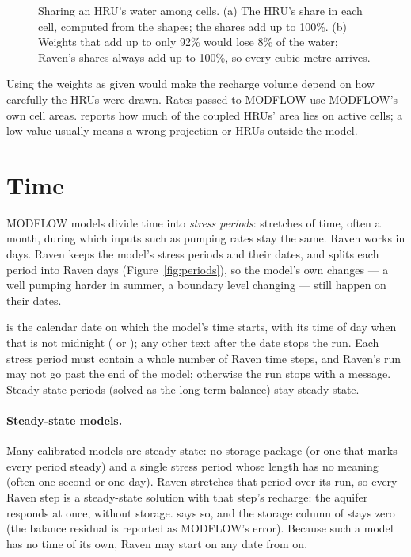 \begin{figure}[!htbp]\centering
\caption{Sharing an HRU's water among cells. (a) The HRU's share in each cell, computed from the shapes; the shares add up to 100\%. (b) Weights that add up to only 92\% would lose 8\% of the water; Raven's shares always add up to 100\%, so every cubic metre arrives.}\label{fig:linking}
\end{figure}

Using the weights as given would make the recharge volume depend on how carefully the HRUs were drawn. Rates passed to MODFLOW use MODFLOW's own cell areas.  reports how much of the coupled
HRUs' area lies on active cells; a low value usually means a wrong projection or HRUs outside the model.

\section{Time}\label{sec:existingtime}
MODFLOW models divide time into \emph{stress periods}: stretches of time, often a month, during which inputs such as pumping
rates stay the same. Raven works in days. Raven keeps the model's stress periods and their dates, and splits each period into
Raven days (Figure~\ref{fig:periods}), so the model's own changes --- a well pumping harder in summer, a boundary level
changing --- still happen on their dates.

 is the calendar date on which the model's time starts, with its time of day when that is not midnight
( or ); any other text after the date stops the run. Each stress period must contain a whole number of
Raven time steps, and Raven's run may not go past the end of the model; otherwise the run stops with a message. Steady-state
periods (solved as the long-term balance) stay steady-state.

\paragraph{Steady-state models.} Many calibrated models are steady state: no storage package (or one that marks every period
steady) and a single stress period whose length has no meaning (often one second or one day). Raven stretches that period
over its run, so every Raven step is a steady-state solution with that step's recharge: the aquifer responds at once, without
storage.  says so, and the storage column of  stays zero (the balance residual is
reported as MODFLOW's error). Because such a model has no time of its own, Raven may start on any date from
 on.

